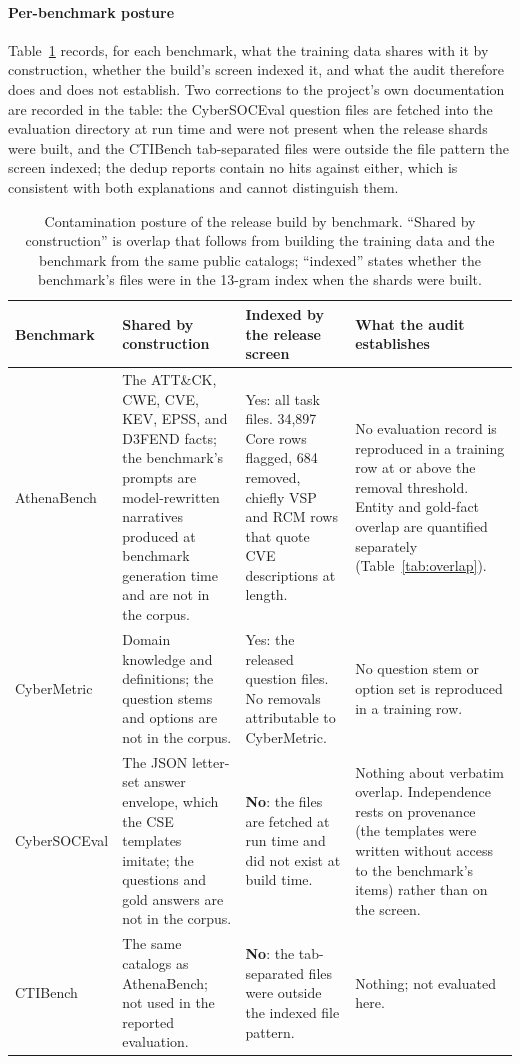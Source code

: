 \documentclass[twocolumn]{svjour3}
\begin{document}
\begin{appendix}
\paragraph{Per-benchmark posture}
Table~\ref{tab:contamposture} records, for each benchmark, what the training data shares with it by construction, whether the build's screen indexed it, and what the audit therefore does and does not establish. Two corrections to the project's own documentation are recorded in the table: the CyberSOCEval question files are fetched into the evaluation directory at run time and were not present when the release shards were built, and the CTIBench tab-separated files were outside the file pattern the screen indexed; the dedup reports contain no hits against either, which is consistent with both explanations and cannot distinguish them.

\begin{table}
\centering\footnotesize
\caption{Contamination posture of the release build by benchmark. ``Shared by construction'' is overlap that follows from building the training data and the benchmark from the same public catalogs; ``indexed'' states whether the benchmark's files were in the 13-gram index when the shards were built.}\label{tab:contamposture}
\begin{tabularx}{\textwidth}{@{}p{2.2cm}XXX@{}}
\toprule Benchmark & Shared by construction & Indexed by the release screen & What the audit establishes \\\midrule
AthenaBench & The ATT\&CK, CWE, CVE, KEV, EPSS, and D3FEND facts; the benchmark's prompts are model-rewritten narratives produced at benchmark generation time and are not in the corpus. & Yes: all task files. 34,897 Core rows flagged, 684 removed, chiefly VSP and RCM rows that quote CVE descriptions at length. & No evaluation record is reproduced in a training row at or above the removal threshold. Entity and gold-fact overlap are quantified separately (Table~\ref{tab:overlap}). \\
CyberMetric & Domain knowledge and definitions; the question stems and options are not in the corpus. & Yes: the released question files. No removals attributable to CyberMetric. & No question stem or option set is reproduced in a training row. \\
CyberSOCEval & The JSON letter-set answer envelope, which the CSE templates imitate; the questions and gold answers are not in the corpus. & \textbf{No}: the files are fetched at run time and did not exist at build time. & Nothing about verbatim overlap. Independence rests on provenance (the templates were written without access to the benchmark's items) rather than on the screen. \\
CTIBench & The same catalogs as AthenaBench; not used in the reported evaluation. & \textbf{No}: the tab-separated files were outside the indexed file pattern. & Nothing; not evaluated here. \\
\bottomrule
\end{tabularx}
\end{table}


\end{appendix}
\end{document}
